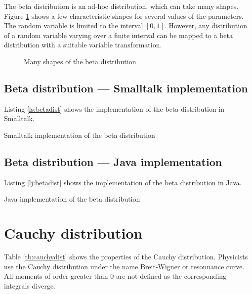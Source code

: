 \documentclass[twoside]{book}
\begin{document}
The beta distribution is an ad-hoc distribution, which can take
many shapes. Figure \ref{fig:betaDistr} shows a few characteristic
shapes for several values of the parameters. The random variable
is limited to the interval $\left[0,1\right]$. However, any
distribution of a random variable varying over a finite interval
can be mapped to a beta distribution with a suitable variable
transformation.
\begin{figure}
\center{}
\caption{Many shapes of the beta
distribution}\label{fig:betaDistr}
\end{figure}


\subsection{Beta distribution --- Smalltalk  implementation}
Listing \ref{ls:betadist} shows the implementation of the beta
distribution in Smalltalk.

\begin{listing} Smalltalk implementation of the beta distribution \label{ls:betadist}

\end{listing}

\subsection{Beta distribution --- Java  implementation}
Listing \ref{lj:betadist} shows the implementation of the beta
distribution in Java.

\begin{listing} Java implementation of the beta distribution \label{lj:betadist}

\end{listing}

\section{Cauchy distribution}
\label{sec:cauchydist} Table \ref{tb:cauchydist} shows the
properties of the Cauchy distribution. Physicists use the Cauchy
distribution under the name Breit-Wigner or resonnance curve. All
moments of order greater than 0 are not defined as the
corresponding integrals diverge.
\end{document}
